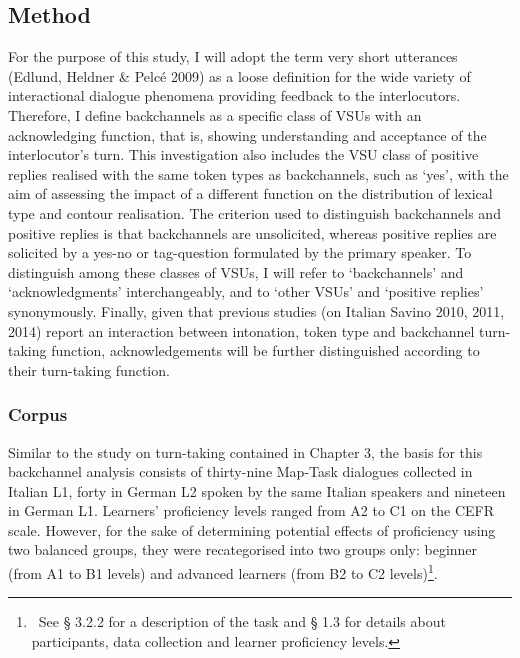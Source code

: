 \subsection{Method}
\hypertarget{Toc191305947}{}\begin{styleStandard}
For the purpose of this study, I will adopt the term very short utterances (Edlund, Heldner \& Pelcé 2009) as a loose definition for the wide variety of interactional dialogue phenomena providing feedback to the interlocutors. Therefore, I define backchannels as a specific class of VSUs with an acknowledging function, that is, showing understanding and acceptance of the interlocutor’s turn. This investigation also includes the VSU class of positive replies realised with the same token types as backchannels, such as ‘yes’, with the aim of assessing the impact of a different function on the distribution of lexical type and contour realisation. The criterion used to distinguish backchannels and positive replies is that backchannels are unsolicited, whereas positive replies are solicited by a yes-no or tag-question formulated by the primary speaker. To distinguish among these classes of VSUs, I will refer to ‘backchannels’ and ‘acknowledgments’ interchangeably, and to ‘other VSUs’ and ‘positive replies’ synonymously. Finally, given that previous studies (on Italian Savino 2010, 2011, 2014) report an interaction between intonation, token type and backchannel turn-taking function, acknowledgements will be further distinguished according to their turn-taking function.
\end{styleStandard}

\subsubsection{Corpus}
\hypertarget{Toc191305948}{}\begin{styleStandard}
Similar to the study on turn-taking contained in Chapter 3, the basis for this backchannel analysis consists of thirty-nine Map-Task dialogues collected in Italian L1, forty in German L2 spoken by the same Italian speakers and nineteen in German L1. Learners’ proficiency levels ranged from A2 to C1 on the CEFR scale. However, for the sake of determining potential effects of proficiency using two balanced groups, they were recategorised into two groups only: beginner (from A1 to B1 levels) and advanced learners (from B2 to C2 levels)\textstyleFootnoteSymbol{ }\footnote{\ See § 3.2.2 for a description of the task and § 1.3 for details about participants, data collection and learner proficiency levels.}.
\end{styleStandard}

